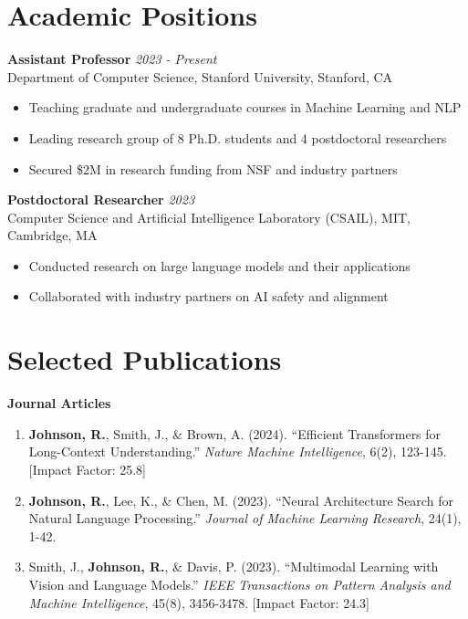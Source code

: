 \documentclass[11pt]{article}
\begin{document}
\vspace{0.2cm}

\section*{Academic Positions}

\textbf{Assistant Professor} \hfill \textit{2023 - Present} \\
Department of Computer Science, Stanford University, Stanford, CA
\begin{itemize}[leftmargin=*, itemsep=2pt]
    \item Teaching graduate and undergraduate courses in Machine Learning and NLP
    \item Leading research group of 8 Ph.D. students and 4 postdoctoral researchers
    \item Secured \$2M in research funding from NSF and industry partners
\end{itemize}

\vspace{0.15cm}

\textbf{Postdoctoral Researcher} \hfill \textit{2023} \\
Computer Science and Artificial Intelligence Laboratory (CSAIL), MIT, Cambridge, MA
\begin{itemize}[leftmargin=*, itemsep=2pt]
    \item Conducted research on large language models and their applications
    \item Collaborated with industry partners on AI safety and alignment
\end{itemize}

\vspace{0.2cm}

\section*{Selected Publications}

\textbf{Journal Articles}

\begin{enumerate}[leftmargin=*, itemsep=4pt]
    \item \textbf{Johnson, R.}, Smith, J., \& Brown, A. (2024). ``Efficient Transformers for Long-Context Understanding.'' \textit{Nature Machine Intelligence}, 6(2), 123-145. [Impact Factor: 25.8]
    
    \item \textbf{Johnson, R.}, Lee, K., \& Chen, M. (2023). ``Neural Architecture Search for Natural Language Processing.'' \textit{Journal of Machine Learning Research}, 24(1), 1-42.
    
    \item Smith, J., \textbf{Johnson, R.}, \& Davis, P. (2023). ``Multimodal Learning with Vision and Language Models.'' \textit{IEEE Transactions on Pattern Analysis and Machine Intelligence}, 45(8), 3456-3478. [Impact Factor: 24.3]
\end{enumerate}
\end{document}

